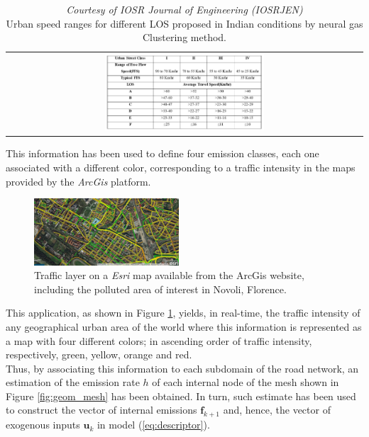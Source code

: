\documentclass[journal]{IEEEtran}
\newcommand{\mb}{\mathbf}
\begin{document}
\begin{table}[tbp]
 \centering
 \begin{center}  
  \begin{tabular}{c}
      \includegraphics[width=0.457\textwidth]{figure/fig_urban_gas.jpg}
  \end{tabular}
\end{center}  
\caption{\textit{Courtesy of IOSR Journal of Engineering (IOSRJEN)} \cite{bib:neuralgasindian}\\ Urban speed ranges for different LOS proposed in Indian conditions by neural gas Clustering method.} 
  \label{tab:flowvelocity}
\end{table}
This information has been used to define four emission classes, each one associated with a different color, corresponding to a traffic intensity in the maps provided by the \textit{ArcGis} platform.
\begin{figure}[tbp]
	\centering
	\includegraphics[width=0.48\textwidth]{figure/fig_traffic_arcgis.jpg}
	\caption{Traffic layer on a \textit{Esri} map available from the ArcGis website, including the polluted area of interest in Novoli, Florence.}
	\label{fig:arcgis}
\end{figure}
This application, as shown in Figure \ref{fig:arcgis}, yields, in real-time, the traffic intensity of any geographical urban area of the world where this information is represented as a map with four different colors; in ascending order of traffic intensity, respectively, green, yellow, orange and red. \\
Thus, by associating this information to each subdomain of the road network, an estimation of the emission rate $h$ of each internal node of the mesh shown in Figure \ref{fig:geom_mesh} has been obtained. 
In turn, such estimate has been used to construct the vector of internal emissions $\mb{f}_{k+1}$ and, hence, the vector of exogenous inputs $\mb{u}_k$ in model
(\ref{eq:descriptor}).
\end{document}
